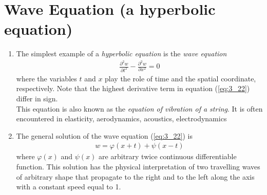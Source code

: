 \documentclass[11pt]{report}
\newcommand{\refn}[1]{(\ref{#1})}
\newcommand{\refx}[1]{\refn{eq:#1}}
\begin{document}
	\section{Wave Equation (a hyperbolic equation)}
	\begin{enumerate}
		\item The simplest example of a \textit{hyperbolic equation} is the \textit{wave equation}
		\begin{eqnarray}
			\frac{\partial^2 w}{\partial t^2} - \frac{\partial^2 w}{\partial x^2} = 0\label{eq:3_22}
		\end{eqnarray}
		where the variables $t$ and $x$ play the role of time and the spatial coordinate, respectively. Note that the highest derivative term in equation \refx{3_22} differ in sign.\\
		This equation is also known as the \textit{equation of vibration of a string}. It is often encountered in elasticity, aerodynamics, acoustics, electrodynamics
		
		\item The general solution of the wave equation \refx{3_22} is
		\begin{eqnarray}
			w = \varphi(x+t) + \psi(x-t)\label{eq:3_23}
		\end{eqnarray}
		where $\varphi(x)$ and $\psi(x)$ are arbitrary twice continuous differentiable function. This solution has the physical interpretation of two travelling waves of arbitrary shape that propagate to the right and to the left along the axis with a constant speed equal to 1.
	\end{enumerate}
\end{document}
